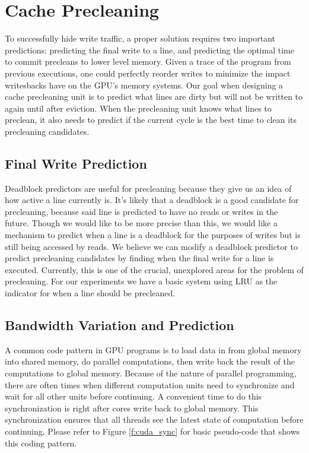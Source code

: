 \section{Cache Precleaning}

To successfully hide write traffic, a proper solution requires two important predictions: predicting the final write to a line, and predicting the optimal time to commit precleans to lower level memory. Given a trace of the program from previous executions, one could perfectly reorder writes to minimize the impact writesbacks have on the GPU's memory systems. Our goal when designing a cache precleaning unit is to predict what lines are dirty but will not be written to again until after eviction. When the precleaning unit knows what lines to preclean, it also needs to predict if the current cycle is the best time to clean its precleaning candidates.

\subsection{Final Write Prediction}
Deadblock predictors are useful for precleaning because they give us an idea of how active a line currently is. It's likely that a deadblock is a good candidate for precleaning, because said line is predicted to have no reads or writes in the future. Though we would like to be more precise than this, we would like a mechanism to predict when a line is a deadblock for the purposes of writes but is still being accessed by reads. We believe we can modify a deadblock predictor to predict precleaning candidates by finding when the final write for a line is executed. Currently, this is one of the crucial, unexplored areas for the problem of precleaning. For our experiments we have a basic system using LRU as the indicator for when a line should be precleaned.

\subsection{Bandwidth Variation and Prediction}
A common code pattern in GPU programs is to load data in from global memory into shared memory, do parallel computations, then write back the result of the computations to global memory. Because of the nature of parallel programming, there are often times when different computation units need to synchronize and wait for all other units before continuing. A convenient time to do this synchronization is right after cores write back to global memory. This synchronization ensures that all threads see the latest state of computation before continuing. Please refer to Figure \ref{f:cuda_sync} for basic pseudo-code that shows this coding pattern.

